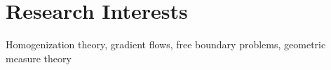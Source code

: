 \section{Research Interests}
{Homogenization theory, gradient flows, free boundary problems, geometric measure theory}




